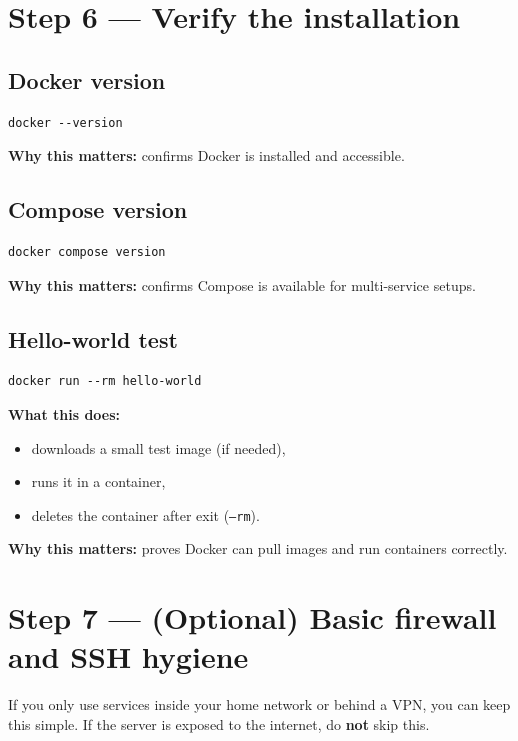 \section{Step 6 --- Verify the installation}
\subsection{Docker version}
\begin{lstlisting}
docker --version
\end{lstlisting}
\textbf{Why this matters:} confirms Docker is installed and accessible.

\subsection{Compose version}
\begin{lstlisting}
docker compose version
\end{lstlisting}
\textbf{Why this matters:} confirms Compose is available for multi-service setups.

\subsection{Hello-world test}
\begin{lstlisting}
docker run --rm hello-world
\end{lstlisting}

\textbf{What this does:}
\begin{itemize}[leftmargin=*]
  \item downloads a small test image (if needed),
  \item runs it in a container,
  \item deletes the container after exit (\texttt{--rm}).
\end{itemize}

\textbf{Why this matters:} proves Docker can pull images and run containers correctly.



\section{Step 7 --- (Optional) Basic firewall and SSH hygiene}
If you only use services inside your home network or behind a VPN, you can keep this simple.
If the server is exposed to the internet, do \textbf{not} skip this.

